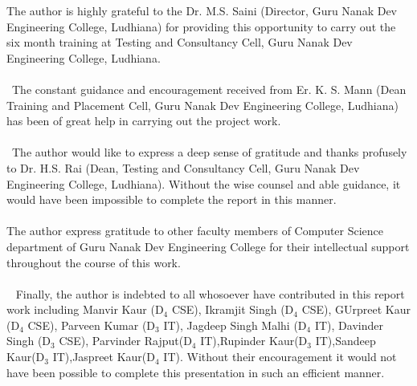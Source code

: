 \begin{Large}
\end{Large}
The author is highly grateful to the Dr. M.S. Saini (Director, Guru Nanak Dev Engineering College, Ludhiana) for providing this opportunity to carry out the six month training at Testing and Consultancy Cell, Guru Nanak Dev Engineering College, Ludhiana.\\ \\
 The constant guidance and encouragement received from Er. K. S. Mann (Dean Training and Placement Cell, Guru Nanak Dev Engineering
College, Ludhiana) has been of great help in carrying out the project work.\\ \\
 The author would like to express a deep sense of gratitude and thanks profusely to Dr. H.S. Rai (Dean, Testing and Consultancy Cell, Guru Nanak Dev Engineering College, Ludhiana). Without the wise counsel and able guidance, it would have been impossible to complete the report in this manner. \\ \\
The author express gratitude to other faculty members of Computer Science department of Guru Nanak Dev Engineering College for their intellectual support throughout the course of this work.\\ \\
 
Finally, the author is indebted to all whosoever have contributed in this report work including Manvir Kaur (D$_4$ CSE), Ikramjit Singh (D$_4$ CSE), GUrpreet Kaur (D$_4$ CSE), Parveen Kumar (D$_3$ IT), Jagdeep Singh Malhi (D$_4$ IT), Davinder Singh (D$_3$ CSE), Parvinder Rajput(D$_4$ IT),Rupinder Kaur(D$_3$ IT),Sandeep Kaur(D$_3$ IT),Jaspreet Kaur(D$_4$ IT). Without their encouragement it would not have been possible to complete this presentation in such an efficient manner. 
